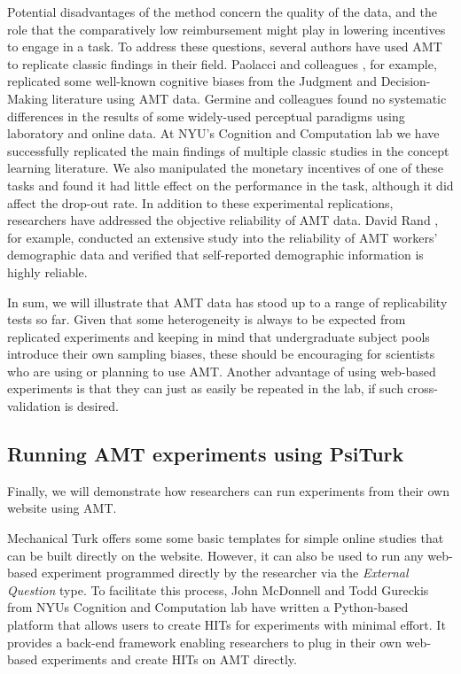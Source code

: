 \documentclass[10pt,letterpaper]{article}
\begin{document}
Potential disadvantages of the method concern the quality of the data, and the
role that the comparatively low reimbursement might play in lowering incentives
to engage in a task.  To address these questions, several authors have used AMT
to replicate classic findings in their field.  Paolacci and colleagues
\citeyear{paolacci2010running}, for example, replicated some well-known
cognitive biases from the Judgment and Decision-Making literature using AMT data.
Germine and colleagues \citeyear{germine2012web}  found no systematic differences
in the results of  some widely-used perceptual paradigms using laboratory and
online data.  At NYU's Cognition and Computation lab we have successfully
replicated the main findings of multiple classic studies in the concept learning
literature.   We also manipulated the
monetary incentives of one of these tasks and found it had little effect on the
performance in the task, although it did affect the drop-out rate.  In addition
to these experimental replications, researchers have addressed the objective
reliability of AMT data.  David Rand \citeyear{rand2012promise}, for example,
conducted an extensive study into the reliability of AMT workers' demographic
data  and verified that self-reported demographic information is highly reliable.

In sum, we will illustrate that AMT data has stood up to a range of replicability
tests so far.  Given that some heterogeneity is always to be expected from
replicated experiments and keeping in mind that undergraduate subject pools
introduce their own sampling biases, these should be encouraging for scientists
who are using or planning to use {AMT}.  Another advantage of using web-based
experiments is that they can just as easily be repeated in the lab, if such
cross-validation is desired.


\subsection{Running AMT experiments using PsiTurk}
Finally, we will demonstrate how researchers can run experiments from their own
website using AMT.

Mechanical Turk offers some some basic templates for simple online studies that
can be built directly on the website.  However, it can also be used to run any
web-based experiment programmed directly by the researcher via the \emph{External
Question} type.  To facilitate this process, John McDonnell and Todd Gureckis
from NYUs Cognition and Computation lab have written a Python-based platform that
allows users to create  HITs for experiments with minimal effort.  It provides a
back-end framework enabling researchers to plug in their own web-based
experiments and create HITs on AMT directly.  
\end{document}
